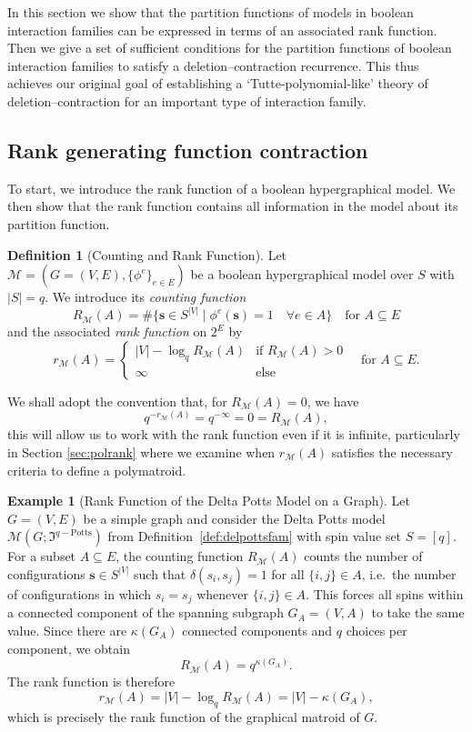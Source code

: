 \documentclass[11pt,reqno]{amsart}
\newcommand{\vecs}{\boldsymbol{s}}
\newcommand{\Mo}{\mathcal{M}}
\newcommand{\mcp}{\mathfrak{I}^{q-\mathrm{Potts}}}
\theoremstyle{plain}
\theoremstyle{definition}
\newtheorem{definition}[theorem]{Definition}
\newtheorem{example}[theorem]{Example}
\numberwithin{equation}{section}
\begin{document}
In this section we show that the partition functions of models in boolean interaction families can be expressed in terms of an associated rank function. Then we give a set of sufficient conditions for the partition functions of boolean interaction families to satisfy a deletion--contraction recurrence. This thus achieves our original goal of establishing a `Tutte-polynomial-like' theory of deletion--contraction for an important type of interaction family.

\subsection{Rank generating function contraction}
To start, we introduce the rank function of a boolean hypergraphical model. We then show that the rank function contains all information in the model about its partition function.
\begin{definition}[Counting and Rank Function]
\label{def:rankfunc}
Let $\Mo = (G=(V,E),\{\phi^e\}_{e\in E})$ be a boolean hypergraphical model over $S$ with $|S| = q$.
We introduce its \emph{counting function}
\[
R_\Mo(A) = \#\{\vecs \in S^{|V|} \mid \phi^e(\vecs) = 1 \quad \forall e\in A\} \quad \text{for } A\subseteq E
\]
and the associated \emph{rank function} on $2^E$ by   
\[
r_\Mo(A) = \begin{cases} |V|- \log_q  R_\Mo(A) &\text{if } R_{\Mo}(A) > 0 \\
\infty &\text{else}
\end{cases} \quad \text{for } A\subseteq E. 
\] 
\end{definition}

We shall adopt the convention that, for $R_{\Mo}(A) = 0$, we have
\[ q^{-r_\Mo(A)} = q^{-\infty} = 0 = R_{\Mo}(A),\]
this will allow us to work with the rank function even if it is infinite, particularly in Section \ref{sec:polrank} where we examine when $r_\Mo(A)$ satisfies the necessary criteria to define a polymatroid.

\begin{example}[Rank Function of the Delta Potts Model on a Graph]
    \label{ex:rankfunc_potts_graph}
    Let $G = (V,E)$ be a simple graph and consider the Delta Potts model $\Mo(G; \mcp)$ from Definition~\ref{def:delpottsfam} with spin value set $S = [q]$. For a subset $A \subseteq E$, the counting function $R_{\Mo}(A)$ counts the number of configurations $\vecs \in S^{|V|}$ such that $\delta(s_i, s_j) = 1$ for all $\{i,j\} \in A$, i.e.\ the number of configurations in which $s_i = s_j$ whenever $\{i,j\} \in A$. This forces all spins within a connected component of the spanning subgraph $G_A = (V, A)$ to take the same value. Since there are $\kappa(G_A)$ connected components and $q$ choices per component, we obtain
    \[
    R_{\Mo}(A) = q^{\kappa(G_A)}.
    \]
    The rank function is therefore
    \[
    r_{\Mo}(A) = |V| - \log_q R_{\Mo}(A) = |V| - \kappa(G_A),
    \]
    which is precisely the rank function of the graphical matroid of $G$.
\end{example}
\end{document}
